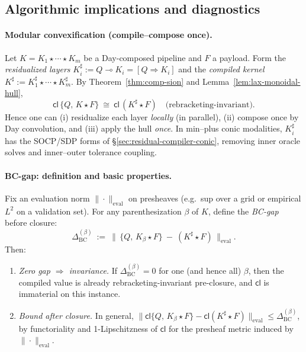 \documentclass[11pt]{article}
\numberwithin{equation}{section}
\theoremstyle{upright}
\begin{document}
\subsection{Algorithmic implications and diagnostics}
\label{subsec:alg-diagnostics}

\paragraph{Modular convexification (compile--compose once).}
Let $K=K_1\star\cdots\star K_m$ be a Day-composed pipeline and $F$ a payload.
Form the \emph{residualized layers} $K_i^\sharp:=Q\multimap K_i=[Q\Rightarrow K_i]$
and the \emph{compiled kernel} $K^\sharp:=K_1^\sharp\star\cdots\star K_m^\sharp$.
By Theorem~\ref{thm:comp-sion} and Lemma~\ref{lem:lax-monoidal-hull},
\[
\mathsf{cl}\,\{Q,\,K\star F\}\ \cong\ \mathsf{cl}\,(K^\sharp\star F)
\quad\text{(rebracketing-invariant).}
\]
Hence one can (i) residualize each layer \emph{locally} (in parallel), (ii) compose once
by Day convolution, and (iii) apply the hull \emph{once}. In min--plus conic modalities,
$K_i^\sharp$ has the SOCP/SDP forms of \S\ref{sec:residual-compiler-conic}, removing inner
oracle solves and inner--outer tolerance coupling.

\paragraph{BC-gap: definition and basic properties.}
Fix an evaluation norm $\|\cdot\|_{\mathrm{eval}}$ on presheaves (e.g.\ sup over a grid or
empirical $L^2$ on a validation set). For any parenthesization $\beta$ of $K$, define the
\emph{BC-gap} before closure:
\begin{equation}\label{eq:BC-gap}
\Delta_{\mathrm{BC}}^{(\beta)}\ :=\
\Big\|\,\{Q,\,K_\beta\star F\}\ -\ (K^\sharp\star F)\,\Big\|_{\mathrm{eval}}.
\end{equation}
Then:
\begin{enumerate}[label=(G\arabic*), itemsep=.25ex]
\item \emph{Zero gap $\Rightarrow$ invariance.} If $\Delta_{\mathrm{BC}}^{(\beta)}=0$ for one
(and hence all) $\beta$, then the compiled value is already rebracketing-invariant pre-closure,
and $\mathsf{cl}$ is immaterial on this instance.
\item \emph{Bound after closure.} In general,
\(
\big\|\mathsf{cl}\{Q,\,K_\beta\star F\}-\mathsf{cl}(K^\sharp\star F)\big\|_{\mathrm{eval}}
\le \Delta_{\mathrm{BC}}^{(\beta)}
\),
by functoriality and 1-Lipschitzness of $\mathsf{cl}$ for the presheaf metric induced by
$\|\cdot\|_{\mathrm{eval}}$.
\end{enumerate}
\end{document}
